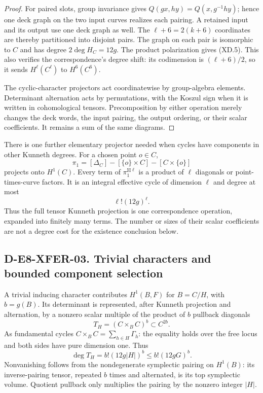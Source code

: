 \begin{proof}
For paired slots, group invariance gives
\(Q(gx,hy)=Q(x,g^{-1}hy)\); hence one deck graph on the two
input curves realizes each pairing.  A retained input and its
output use one deck graph as well.  The \(\ell+6=2(k+6)\)
coordinates are thereby partitioned into disjoint pairs.
The graph on each pair is isomorphic to \(C\) and has degree
\(2\deg H_C=12g\).  The product polarization gives (XD.5).
This also verifies the correspondence's degree shift:
its codimension is \((\ell+6)/2\), so it sends \(H^\ell(C^\ell)\)
to \(H^6(C^6)\).

The cyclic-character projectors act coordinatewise by group-algebra
elements.  Determinant alternation acts by permutations, with
the Koszul sign when it is written in cohomological tensors.
Precomposition by either operation merely changes the deck words,
the input pairing, the output ordering, or their scalar coefficients.
It remains a sum of the same diagrams.
\end{proof}

There is one further elementary projector needed when cycles have
components in other Kunneth degrees.  For a chosen point \(o\in C\),
\[
 \pi_1=[\Delta_C]-[\{o\}\times C]-[C\times\{o\}]
\]
projects onto \(H^1(C)\).  Every term of \(\pi_1^{\boxtimes\ell}\)
is a product of \(\ell\) diagonals or point-times-curve factors.
It is an integral effective cycle of dimension \(\ell\) and degree
at most
\[
                         \ell!(12g)^\ell.                   \tag{XD.7}
\]
Thus the full tensor Kunneth projection is one correspondence
operation, expanded into finitely many terms.  The number or sizes
of their scalar coefficients are not a degree cost for the
existence conclusion below.

\subsection*{D-E8-XFER-03. Trivial characters and bounded component selection}

A trivial inducing character contributes \(H^1(B,F)\) for
\(B=C/H\), with \(b=g(B)\).  Its determinant is represented,
after Kunneth projection and alternation, by a nonzero scalar
multiple of the product of \(b\) pullback diagonals
\[
                  T_H=(C\times_B C)^b\subset C^{2b}.
\]
As fundamental cycles \(C\times_B C=\sum_{h\in H}\Gamma_h\):
the equality holds over the free locus and both sides have
pure dimension one.  Thus
\[
                   \deg T_H=b!(12g|H|)^b
                              \leq b!(12gG)^b.              \tag{XD.8}
\]
Nonvanishing follows from the nondegenerate symplectic pairing
on \(H^1(B)\): its inverse-pairing tensor, repeated \(b\) times
and alternated, is its top symplectic volume.  Quotient pullback
only multiplies the pairing by the nonzero integer \(|H|\).

